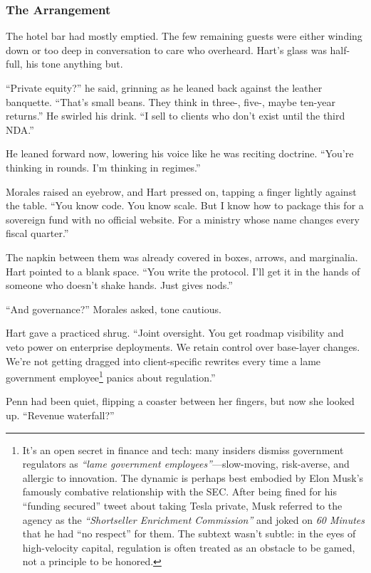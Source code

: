 \medskip

\subsubsection{The Arrangement}

The hotel bar had mostly emptied. The few remaining guests were either winding down or too deep in conversation to 
care who overheard. Hart’s glass was half-full, his tone anything but.

“Private equity?” he said, grinning as he leaned back against the leather banquette. “That’s small beans. They think 
in three-, five-, maybe ten-year returns.” He swirled his drink. “I sell to clients who don’t exist until the 
third NDA.”

He leaned forward now, lowering his voice like he was reciting doctrine. “You’re thinking in rounds. 
I’m thinking in regimes.”

Morales raised an eyebrow, and Hart pressed on, tapping a finger lightly against the table. “You know code. 
You know scale. But I know how to package this for a sovereign fund with no official website. For a ministry whose name 
changes every fiscal quarter.”

The napkin between them was already covered in boxes, arrows, and marginalia. Hart pointed to a blank space. “You 
write the protocol. I’ll get it in the hands of someone who doesn’t shake hands. Just gives nods.”

“And governance?” Morales asked, tone cautious.

Hart gave a practiced shrug. “Joint oversight. You get roadmap visibility and veto power on enterprise deployments. 
We retain control over base-layer changes. We’re not getting dragged into client-specific rewrites every time a 
lame government employee\footnote{
It’s an open secret in finance and tech: many insiders dismiss government regulators as \emph{``lame government 
employees''}—slow-moving, risk-averse, and allergic to innovation. The dynamic is perhaps best embodied by Elon Musk’s 
famously combative relationship with the SEC. After being fined for his “funding secured” tweet about taking Tesla 
private, Musk referred to the agency as the \emph{“Shortseller Enrichment Commission”} and joked on \emph{60 
Minutes} that he had “no respect” for them. The subtext wasn’t subtle: in the eyes of high-velocity capital, 
regulation is often treated as an obstacle to be gamed, not a principle to be honored.
}
panics about regulation.”

Penn had been quiet, flipping a coaster between her fingers, but now she looked up. “Revenue waterfall?”

